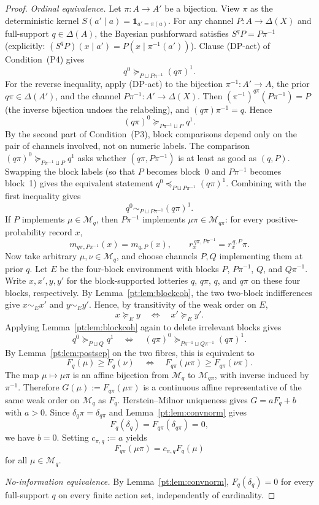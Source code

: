 \documentclass[11pt,a4paper]{article}
\theoremstyle{definition}
\newcommand{\1}{\mathbf 1}
\begin{document}
\begin{proof}
\emph{Ordinal equivalence.}  Let $\pi:A\to A'$ be a bijection.  View $\pi$ as the deterministic kernel
$S(a'\mid a)=\1_{a'=\pi(a)}$.  For any channel $P:A\to\Delta(X)$ and full-support $q\in\Delta(A)$, the Bayesian
pushforward satisfies $S^qP=P\pi^{-1}$ (explicitly: $(S^qP)(x\mid a')=P(x\mid\pi^{-1}(a'))$).  Clause
\textup{(DP-act)} of Condition~\textup{(P4)} gives
\[
q^0\succeq_{P\sqcup P\pi^{-1}}(q\pi)^1.
\]
For the reverse inequality, apply \textup{(DP-act)} to the bijection $\pi^{-1}:A'\to A$, the prior $q\pi\in\Delta(A')$,
and the channel $P\pi^{-1}:A'\to\Delta(X)$.  Then $(\pi^{-1})^{q\pi}(P\pi^{-1})=P$ (the inverse bijection undoes the
relabeling), and $(q\pi)\pi^{-1}=q$.  Hence
\[
(q\pi)^0\succeq_{P\pi^{-1}\sqcup P}q^1.
\]
By the second part of Condition~\textup{(P3)}, block comparisons depend only on the pair of channels involved, not on
numeric labels.  The comparison $(q\pi)^0\succeq_{P\pi^{-1}\sqcup P}q^1$ asks whether $(q\pi,P\pi^{-1})$ is at least
as good as $(q,P)$.  Swapping the block labels (so that $P$ becomes block~0 and $P\pi^{-1}$ becomes block~1) gives
the equivalent statement $q^0\preceq_{P\sqcup P\pi^{-1}}(q\pi)^1$.  Combining with the first inequality gives
\[
q^0\sim_{P\sqcup P\pi^{-1}}(q\pi)^1.
\]
If $P$ implements $\mu\in\mathcal M_q$, then $P\pi^{-1}$ implements $\mu\pi\in\mathcal M_{q\pi}$: for every
positive-probability record $x$,
\[
m_{q\pi,P\pi^{-1}}(x)=m_{q,P}(x),
\qquad
r_x^{\,q\pi,P\pi^{-1}}=r_x^{\,q,P}\pi.
\]
Now take arbitrary $\mu,\nu\in\mathcal M_q$, and choose channels $P,Q$ implementing them at prior $q$.  Let $E$ be the
four-block environment with blocks $P$, $P\pi^{-1}$, $Q$, and $Q\pi^{-1}$.  Write $x,x',y,y'$ for the block-supported
lotteries $q$, $q\pi$, $q$, and $q\pi$ on these four blocks, respectively.  By Lemma~\ref{pt:lem:blockcoh}, the two
two-block indifferences give $x\sim_E x'$ and $y\sim_E y'$.  Hence, by transitivity of the weak order on $E$,
\[
x\succeq_E y
\quad\Longleftrightarrow\quad
x'\succeq_E y'.
\]
Applying Lemma~\ref{pt:lem:blockcoh} again to delete irrelevant blocks gives
\[
q^0\succeq_{P\sqcup Q}q^1
\quad\Longleftrightarrow\quad
(q\pi)^0\succeq_{P\pi^{-1}\sqcup Q\pi^{-1}}(q\pi)^1.
\]
By Lemma~\ref{pt:lem:postsep} on the two fibres, this is equivalent to
\[
F_q(\mu)\ge F_q(\nu)
\quad\Longleftrightarrow\quad
F_{q\pi}(\mu\pi)\ge F_{q\pi}(\nu\pi).
\]
The map $\mu\mapsto\mu\pi$ is an affine bijection from $\mathcal M_q$ to $\mathcal M_{q\pi}$, with inverse induced by
$\pi^{-1}$.  Therefore $G(\mu):=F_{q\pi}(\mu\pi)$ is a continuous affine representative of the same weak order on
$\mathcal M_q$ as $F_q$.  Herstein--Milnor uniqueness gives $G=aF_q+b$ with $a>0$.  Since
$\delta_q\pi=\delta_{q\pi}$ and Lemma~\ref{pt:lem:convnorm} gives
\[
F_q(\delta_q)=F_{q\pi}(\delta_{q\pi})=0,
\]
we have $b=0$.  Setting $c_{\pi,q}:=a$ yields
\[
F_{q\pi}(\mu\pi)=c_{\pi,q} F_q(\mu)
\]
for all $\mu\in\mathcal M_q$.

\emph{No-information equivalence.}  By Lemma~\ref{pt:lem:convnorm}, $F_q(\delta_q)=0$ for every full-support $q$ on every
finite action set, independently of cardinality.
\end{proof}
\end{document}
